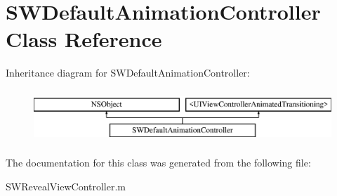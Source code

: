 \hypertarget{interface_s_w_default_animation_controller}{}\section{S\+W\+Default\+Animation\+Controller Class Reference}
\label{interface_s_w_default_animation_controller}
Inheritance diagram for S\+W\+Default\+Animation\+Controller\+:\begin{figure}[H]
\begin{center}
\leavevmode
\includegraphics[height=2.000000cm]{interface_s_w_default_animation_controller}
\end{center}
\end{figure}


The documentation for this class was generated from the following file\+:\begin{DoxyCompactItemize}
\item 
S\+W\+Reveal\+View\+Controller.\+m\end{DoxyCompactItemize}

